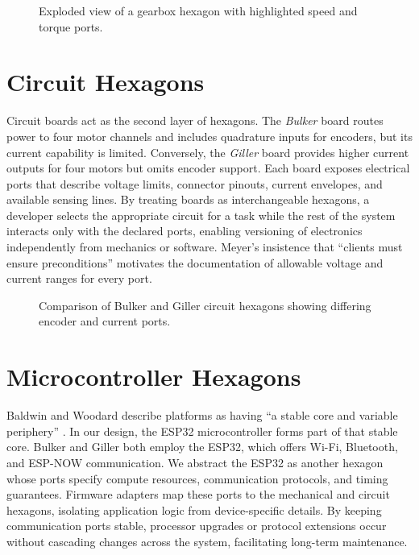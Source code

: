 \begin{figure}[H]
  \centering
  \fbox{\rule{0pt}{2in} \rule{3in}{0pt}}
  \caption{Exploded view of a gearbox hexagon with highlighted speed and torque ports.}
  \label{fig:mech_hex}
\end{figure}

\section{Circuit Hexagons}
Circuit boards act as the second layer of hexagons. The \emph{Bulker} board routes power to four motor channels and includes
quadrature inputs for encoders, but its current capability is limited. Conversely, the \emph{Giller} board provides higher
current outputs for four motors but omits encoder support. Each board exposes electrical ports that describe voltage limits,
connector pinouts, current envelopes, and available sensing lines. By treating boards as interchangeable hexagons, a developer
selects the appropriate circuit for a task while the rest of the system interacts only with the declared ports, enabling
versioning of electronics independently from mechanics or software. Meyer's insistence that ``clients must ensure
preconditions'' \cite{meyer1992} motivates the documentation of allowable voltage and current ranges for every port.

\begin{figure}[H]
  \centering
  \fbox{\rule{0pt}{2in} \rule{3in}{0pt}}
  \caption{Comparison of Bulker and Giller circuit hexagons showing differing encoder and current ports.}
  \label{fig:circuit_hex}
\end{figure}

\section{Microcontroller Hexagons}
Baldwin and Woodard describe platforms as having ``a stable core and variable periphery'' \cite{baldwin2009platforms}. In our
design, the ESP32 microcontroller forms part of that stable core. Bulker and Giller both employ the ESP32, which offers
Wi-Fi, Bluetooth, and ESP-NOW communication. We abstract the ESP32 as another hexagon whose ports specify compute resources,
communication protocols, and timing guarantees. Firmware adapters map these ports to the mechanical and circuit hexagons,
isolating application logic from device-specific details. By keeping communication ports stable, processor upgrades or protocol
extensions occur without cascading changes across the system, facilitating long-term maintenance.

